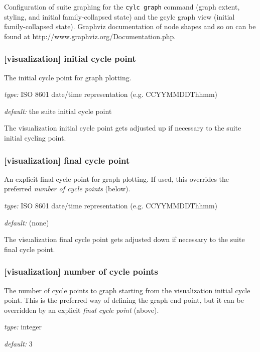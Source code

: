 Configuration of suite graphing for the \lstinline=cylc graph= command (graph
extent, styling, and initial family-collapsed state) and the gcylc graph view
(initial family-collapsed state). Graphviz documentation of node shapes
and so on can be found at http://www.graphviz.org/Documentation.php.

\subsubsection[initial cycle point]{[visualization] \textrightarrow initial cycle point}

The initial cycle point for graph plotting.
\begin{myitemize}
    \item {\em type:} ISO 8601 date/time representation (e.g. CCYYMMDDThhmm)
    \item {\em default:} the suite initial cycle point
\end{myitemize}
The visualization initial cycle point gets adjusted up if necessary to the
suite initial cycling point.

\subsubsection[final cycle point]{[visualization] \textrightarrow final cycle point}

An explicit final cycle point for graph plotting. If used, this overrides the
preferred {\em number of cycle points} (below).
\begin{myitemize}
    \item {\em type:} ISO 8601 date/time representation (e.g. CCYYMMDDThhmm)
    \item {\em default:} (none)
\end{myitemize}
The visualization final cycle point gets adjusted down if necessary to the
suite final cycle point.

\subsubsection[number of cycle points]{[visualization] \textrightarrow number of cycle points}

The number of cycle points to graph starting from the visualization initial
cycle point. This is the preferred way of defining the graph end point, but
it can be overridden by an explicit {\em final cycle point} (above).
\begin{myitemize}
    \item {\em type:} integer
    \item {\em default:} 3
\end{myitemize}

